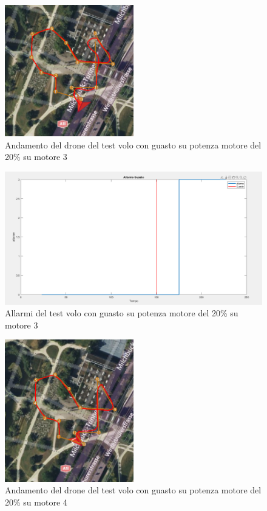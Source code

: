 \begin{figure}[H]
    \centering
    \includegraphics[width=0.5\textwidth]{files/images/path_soglia_fissa3 (2).png}
    \caption{Andamento del drone del test volo con guasto su potenza motore del 20\% su motore 3}
    \label{Risultato volo con guasto su potenza motore del 20\% su motore 3}
\end{figure}
\noindent

\begin{figure}[H]
    \centering
    \includegraphics[width=\textwidth]{files/images/path_soglia_fissa3 (1).png}
    \caption{Allarmi del test volo con guasto su potenza motore del 20\% su motore 3}
    \label{Allarmi del test volo con guasto su potenza motore del 20\% su motore 3}
\end{figure}
\noindent

\begin{figure}[H]
    \centering
    \includegraphics[width=0.5\textwidth]{files/images/path_soglia_fissa4 (2).png}
    \caption{Andamento del drone del test volo con guasto su potenza motore del 20\% su motore 4}
    \label{Risultato volo con guasto su potenza motore del 20\% su motore 4}
\end{figure}
\noindent

